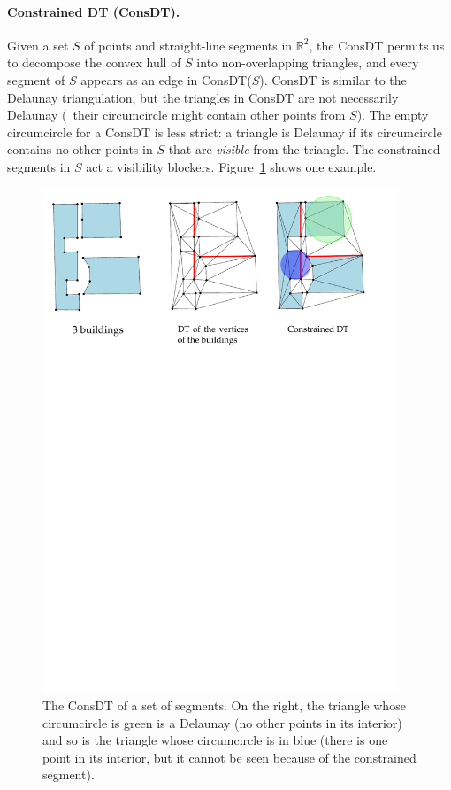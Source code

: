 %
\paragraph*{Constrained DT (ConsDT).}
Given a set $S$ of points and straight-line segments in $\mathbb{R}^2$, the ConsDT permits us to decompose the convex hull of $S$ into non-overlapping triangles, and every segment of $S$ appears as an edge in ConsDT($S$). 
ConsDT is similar to the Delaunay triangulation, but the triangles in ConsDT are not necessarily Delaunay (\ie\ their circumcircle might contain other points from $S$). 
The empty circumcircle for a ConsDT is less strict: a triangle is Delaunay if its circumcircle contains no other points in $S$ that are \emph{visible} from the triangle.
The constrained segments in $S$ act a visibility blockers. 
Figure~\ref{fig:cdt_buildings} shows one example.
\begin{figure}
  \centering
  \includegraphics[width=0.95\textwidth]{figs/cdtbuildings}
  \caption{The ConsDT of a set of segments. On the right, the triangle whose circumcircle is green is a Delaunay (no other points in its interior) and so is the triangle whose circumcircle is in blue (there is one point in its interior, but it cannot be seen because of the constrained segment).}
\label{fig:cdt_buildings}
\end{figure}


